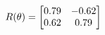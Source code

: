\documentclass[preview]{standalone}
\begin{document}
\begin{align*}
\special{dvisvgm:raw <g id='unique000'>}R(\theta) = \begin{bmatrix}0.79 & -0.62\\0.62 & 0.79\end{bmatrix}\special{dvisvgm:raw </g>}
\end{align*}
\end{document}
